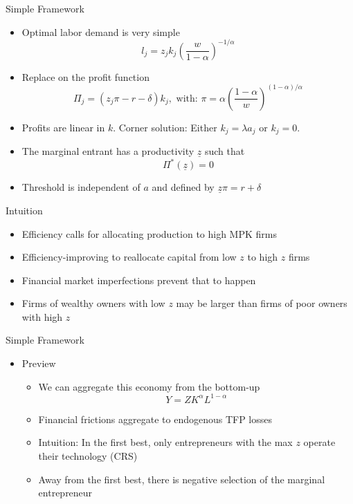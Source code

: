\documentclass[11pt,aspectratio=169,xcolor={dvipsnames},hyperref={pdftex,pdfpagemode=UseNone,hidelinks,pdfdisplaydoctitle=true},usepdftitle=false]{beamer}
\begin{document}
\begin{frame}{Simple Framework}
\begin{itemize}
\item Optimal labor demand is very simple
\[l_j = z_j k_j \left(\frac{w}{1-\alpha} \right)^{-1/\alpha}\]
\item Replace on the profit function
\[\Pi_j = (z_j \pi - r - \delta)k_j, \text{    with:  } \pi = \alpha\left(\frac{1-\alpha}{w}\right)^{(1-\alpha)/\alpha}\]
\item Profits are linear in $k$. Corner solution: Either $k_j = \lambda a_j$ or $k_j = 0$.
\item The marginal entrant has a productivity $\underline{z}$ such that
\[\Pi^*(\underline{z}) = 0 \]
\item Threshold is independent of $a$ and defined by $\underline{z}\pi = r + \delta$
\end{itemize}
\end{frame}

\begin{frame}{Intuition}
\begin{itemize}
\item Efficiency calls for allocating production to high MPK firms
\item Efficiency-improving to reallocate capital from low $z$ to high $z$ firms
\item Financial market imperfections prevent that to happen
\item Firms of wealthy owners with low $z$ may be larger than firms of poor owners with high $z$
\end{itemize}
\end{frame}


\begin{frame}{Simple Framework}
\begin{itemize}
\item Preview
\begin{itemize}
\item We can aggregate this economy from the bottom-up
\[Y = Z K^{\alpha} L^{1-\alpha}\]
\item Financial frictions aggregate to endogenous TFP losses
\item Intuition: In the first best, only entrepreneurs with the max $z$ operate their technology (CRS)
\item Away from the first best, there is negative selection of the marginal entrepreneur
\end{itemize}
\end{itemize}
\end{frame}
\end{document}
